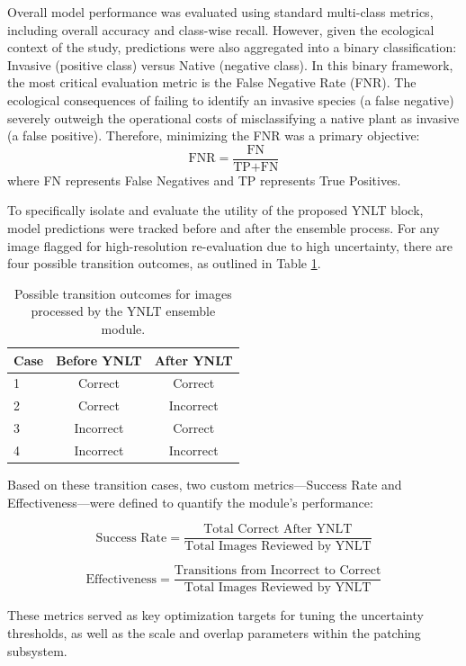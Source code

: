 \documentclass[final,3p,times,twocolumn]{elsarticle}
\begin{document}
Overall model performance was evaluated using standard multi-class metrics, including overall accuracy and class-wise recall. However, given the ecological context of the study, predictions were also aggregated into a binary classification: Invasive (positive class) versus Native (negative class). In this binary framework, the most critical evaluation metric is the False Negative Rate (FNR). The ecological consequences of failing to identify an invasive species (a false negative) severely outweigh the operational costs of misclassifying a native plant as invasive (a false positive). Therefore, minimizing the FNR was a primary objective:
\[
\text{FNR} = \frac{\text{FN}}{\text{TP} + \text{FN}}
\]
where FN represents False Negatives and TP represents True Positives.

To specifically isolate and evaluate the utility of the proposed YNLT block, model predictions were tracked before and after the ensemble process. For any image flagged for high-resolution re-evaluation due to high uncertainty, there are four possible transition outcomes, as outlined in Table \ref{tab:ynlt_outcomes}.

\begin{table}[h]
    \centering
    \begin{tabular}{lcc}
        \hline
        \textbf{Case} & \textbf{Before YNLT} & \textbf{After YNLT} \\
        \hline
        1 & Correct & Correct \\
        2 & Correct & Incorrect \\
        3 & Incorrect & Correct \\
        4 & Incorrect & Incorrect \\
        \hline
    \end{tabular}
    \caption{Possible transition outcomes for images processed by the YNLT ensemble module.}
    \label{tab:ynlt_outcomes}
\end{table}

Based on these transition cases, two custom metrics—Success Rate and Effectiveness—were defined to quantify the module's performance:

\[
\text{Success Rate} = \frac{\text{Total Correct After YNLT}}{\text{Total Images Reviewed by YNLT}}
\]

\[
\text{Effectiveness} = \frac{\text{Transitions from Incorrect to Correct}}{\text{Total Images Reviewed by YNLT}}
\]

These metrics served as key optimization targets for tuning the uncertainty thresholds, as well as the scale and overlap parameters within the patching subsystem.
\end{document}
